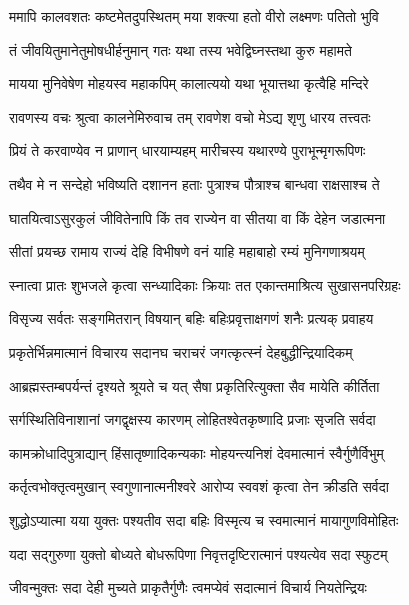 \twolineshloka
{ममापि कालवशतः कष्टमेतदुपस्थितम्}
{मया शक्त्या हतो वीरो लक्ष्मणः पतितो भुवि} %

\twolineshloka
{तं जीवयितुमानेतुमोषधीर्हनुमान् गतः}
{यथा तस्य भवेद्विघ्नस्तथा कुरु महामते} %

\twolineshloka
{मायया मुनिवेषेण मोहयस्व महाकपिम्}
{कालात्ययो यथा भूयात्तथा कृत्वैहि मन्दिरे} %

\twolineshloka
{रावणस्य वचः श्रुत्वा कालनेमिरुवाच तम्}
{रावणेश वचो मेऽद्य शृणु धारय तत्त्वतः} %

\twolineshloka
{प्रियं ते करवाण्येव न प्राणान् धारयाम्यहम्}
{मारीचस्य यथारण्ये पुराभून्मृगरूपिणः} %

\twolineshloka
{तथैव मे न सन्देहो भविष्यति दशानन}
{हताः पुत्राश्च पौत्राश्च बान्धवा राक्षसाश्च ते} %

\twolineshloka
{घातयित्वाऽसुरकुलं जीवितेनापि किं तव}
{राज्येन वा सीतया वा किं देहेन जडात्मना} %

\twolineshloka
{सीतां प्रयच्छ रामाय राज्यं देहि विभीषणे}
{वनं याहि महाबाहो रम्यं मुनिगणाश्रयम्} %

\twolineshloka
{स्नात्वा प्रातः शुभजले कृत्वा सन्ध्यादिकाः क्रियाः}
{तत एकान्तमाश्रित्य सुखासनपरिग्रहः} %

\twolineshloka
{विसृज्य सर्वतः सङ्गमितरान् विषयान् बहिः}
{बहिःप्रवृत्ताक्षगणं शनैः प्रत्यक् प्रवाहय} %

\twolineshloka
{प्रकृतेर्भिन्नमात्मानं विचारय सदानघ}
{चराचरं जगत्कृत्स्नं देहबुद्धीन्द्रियादिकम्} %

\twolineshloka
{आब्रह्मस्तम्बपर्यन्तं दृश्यते श्रूयते च यत्}
{सैषा प्रकृतिरित्युक्ता सैव मायेति कीर्तिता} %

\twolineshloka
{सर्गस्थितिविनाशानां जगद्वृक्षस्य कारणम्}
{लोहितश्वेतकृष्णादि प्रजाः सृजति सर्वदा} %

\twolineshloka
{कामक्रोधादिपुत्राद्यान् हिंसातृष्णादिकन्यकाः}
{मोहयन्त्यनिशं देवमात्मानं स्वैर्गुणैर्विभुम्} %

\twolineshloka
{कर्तृत्वभोक्तृत्वमुखान् स्वगुणानात्मनीश्वरे}
{आरोप्य स्ववशं कृत्वा तेन क्रीडति सर्वदा} %

\twolineshloka
{शुद्धोऽप्यात्मा यया युक्तः पश्यतीव सदा बहिः}
{विस्मृत्य च स्वमात्मानं मायागुणविमोहितः} %

\twolineshloka
{यदा सद्गुरुणा युक्तो बोध्यते बोधरूपिणा}
{निवृत्तदृष्टिरात्मानं पश्यत्येव सदा स्फुटम्} %

\twolineshloka
{जीवन्मुक्तः सदा देही मुच्यते प्राकृतैर्गुणैः}
{त्वमप्येवं सदात्मानं विचार्य नियतेन्द्रियः} %

